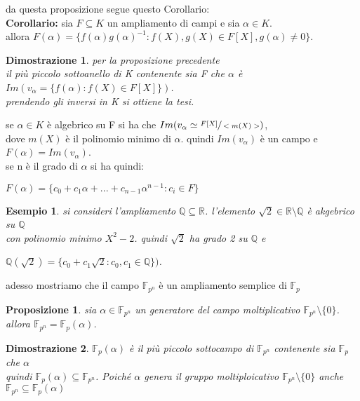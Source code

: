 \documentclass[a4paper,12pt]{article}
\theoremstyle{def}
\theoremstyle{prop}
\newtheorem*{proposition}{Proposizione}
\theoremstyle{esempio}
\newtheorem*{example}{Esempio}
\theoremstyle{dimostrazione}
\newtheorem*{dimostrazione}{Dimostrazione}
\theoremstyle{teo}
\theoremstyle{osservazione}
\begin{document}
da questa proposizione segue questo Corollario:\\

\textbf{Corollario:} sia \(F \subseteq K\) un ampliamento di campi e sia \(\alpha \in K\).\\
allora \(F(\alpha) = \{f(\alpha)g(\alpha)^{-1} : f(X),g(X) \in F[X], g(\alpha) \neq 0\}\).

\begin{dimostrazione}
	per la proposizione precedente\\
	il più piccolo sottoanello di K contenente sia F che \(\alpha\) è \(Im(v_\alpha = \{f(\alpha) : f(X) \in F[X]\})\).\\
	prendendo gli inversi in K si ottiene la tesi.
\end{dimostrazione}

\vspace{\baselineskip}

se \(\alpha \in K\) è algebrico su F si ha che \(Im(v_\alpha \simeq \sfrac{F[X]}{<m(X)>})\),\\
dove \(m(X)\) è il polinomio minimo di \(\alpha\). quindi \(Im(v_\alpha)\) è un campo e \(F(\alpha) = Im(v_\alpha)\).\\
se n è il grado di \(\alpha\) si ha quindi:
\begin{center}
	\(F(\alpha) = \{c_0 + c_1\alpha + ... + c_{n-1}\alpha^{n-1} : c_i \in F\}\)
\end{center}

\begin{example}
	si consideri l'ampliamento \(\mathbb{Q} \subseteq \mathbb{R}\). l'elemento \(\sqrt{2}\in \mathbb{R} \setminus \mathbb{Q}\) è akgebrico su \(\mathbb{Q}\)\\
	con polinomio minimo \(X^2 -2\). quindi \(\sqrt{2}\) ha grado 2 su \(\mathbb{Q}\) e
	\begin{center}
		\(\mathbb{Q}(\sqrt{2}) = \{ c_0 + c_1 \sqrt{2} : c_0,c_1 \in \mathbb{Q}\})\).
	\end{center}
\end{example}

adesso mostriamo che il campo \(\mathbb{F}_{p^n}\) è un ampliamento semplice di \(\mathbb{F}_p\)
\begin{proposition}
	sia \(\alpha \in \mathbb{F}_{p^n}\) un generatore del campo moltiplicativo \(\mathbb{F}_{p^n} \setminus \{0\}\).\\
	allora \(\mathbb{F}_{p^n} = \mathbb{F}_p(\alpha)\).
\end{proposition}

\begin{dimostrazione}
	\(\mathbb{F}_p(\alpha)\) è il più piccolo sottocampo di \(\mathbb{F}_{p^n}\) contenente sia \(\mathbb{F}_p\) che \(\alpha\)\\
	quindi \(\mathbb{F}_p(\alpha) \subseteq \mathbb{F}_{p^n}\). Poiché \(\alpha\) genera il gruppo moltiploicativo \(\mathbb{F}_{p^n} \setminus \{0\}\) anche \(\mathbb{F}_{p^n} \subseteq \mathbb{F}_p(\alpha)\)
\end{dimostrazione}
\end{document}
